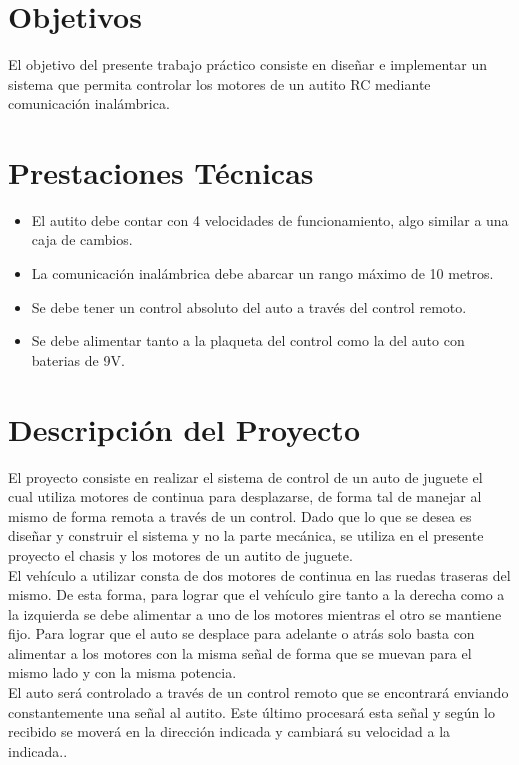 \documentclass[a4paper,10pt]{article}
\title{  }
\begin{document}
	\maketitle %
	\newpage

	\tableofcontents %
	\newpage

	\section{Objetivos}
		El objetivo del presente trabajo práctico consiste en diseñar e implementar un sistema que permita controlar los motores de un autito RC mediante 
		comunicación inalámbrica. 

	\section{Prestaciones Técnicas}
		\begin{itemize}
			\item El autito debe contar con 4 velocidades de funcionamiento, algo similar a una caja de cambios.
			\item La comunicación inalámbrica debe abarcar un rango máximo de 10 metros. 
			\item Se debe tener un control absoluto del auto a través del control remoto.
			\item Se debe alimentar tanto a la plaqueta del control como la del auto con baterias de 9V.
		\end{itemize} 

	\section{Descripción del Proyecto}
		El proyecto consiste en realizar el sistema de control de un auto de juguete el cual utiliza motores de continua para desplazarse, de forma tal de 
		manejar al mismo de forma remota a través de un control. Dado que lo que se desea es diseñar y construir el sistema y no la parte mecánica, se
		 utiliza en el presente proyecto  el chasis y los motores de un autito de juguete. \\
		\indent El vehículo a utilizar consta de dos motores de continua en las ruedas traseras del mismo. De esta forma, para lograr que el vehículo gire 
		tanto a la derecha como a la izquierda se debe alimentar a uno de los motores mientras el otro se mantiene fijo. Para lograr que el auto se desplace 
		para adelante o atrás solo basta con alimentar a los motores con la misma señal de forma que se muevan para el mismo lado y con la misma 
		potencia. \\
		\indent El auto será controlado a través de un control remoto que se encontrará enviando constantemente una señal al autito. Este último procesará 
		esta señal
		y según lo recibido se moverá en la dirección indicada y cambiará su velocidad a la indicada..	
	
\end{document}
